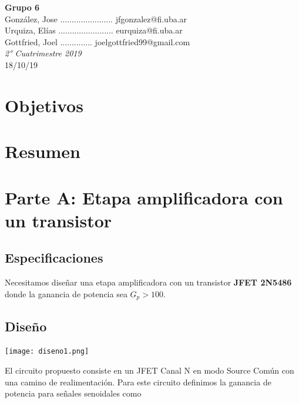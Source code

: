     \begin{center}
        \textbf{Grupo 6}\\
        \medskip
        González, Jose ....................... jfgonzalez@fi.uba.ar\\
        Urquiza, Elías ........................ eurquiza@fi.uba.ar\\
				Gottfried, Joel .............. joelgottfried99@gmail.com\\
        \medskip
        \emph{2° Cuatrimestre 2019}\\
        18/10/19
    \end{center}
    \begin{multicols}{2}
    \justifying
        \section{Objetivos}

        \section{Resumen}

        \section{Parte A: Etapa amplificadora con un transistor}

        \subsection{Especificaciones}

        Necesitamos diseñar una etapa amplificadora con un transistor \textbf{JFET 2N5486} donde la ganancia de potencia sea $G_p > 100$.

        \subsection{Diseño}

        \begin{center}
                   \texttt{[image: diseno1.png]}
        \end{center}


        El circuito propuesto consiste en un JFET Canal N en modo Source Común con una camino de realimentación. Para este circuito definimos la ganancia de potencia para señales senoidales como


\end{multicols}

